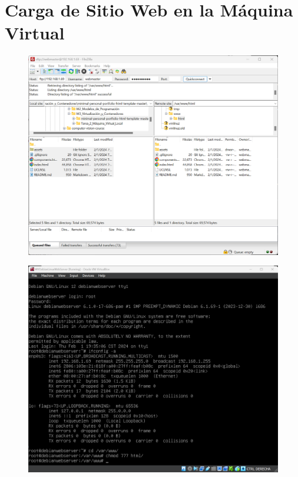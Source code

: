 \documentclass[12pt,a4paper]{article}
\begin{document}
\section{Carga de Sitio Web en la Máquina Virtual}

\begin{figure}[H]
    \centering
    \includegraphics[width=1\linewidth]{M3_Virtualización_y_Contenedores/Tarea_2_Máquina_Virtual_Local/reporte/figuras/6-1_Carga_Sitio_Web_en_MV.png}
    \label{fig:Cargado_sitio_web_1}
\end{figure}

\begin{figure}[H]
    \centering
    \includegraphics[width=1\linewidth]{M3_Virtualización_y_Contenedores/Tarea_2_Máquina_Virtual_Local/reporte/figuras/6-2_Carga_Sitio_Web_en_MV.png}
    \label{fig:Cargado_sitio_web_2}
\end{figure}
\end{document}
